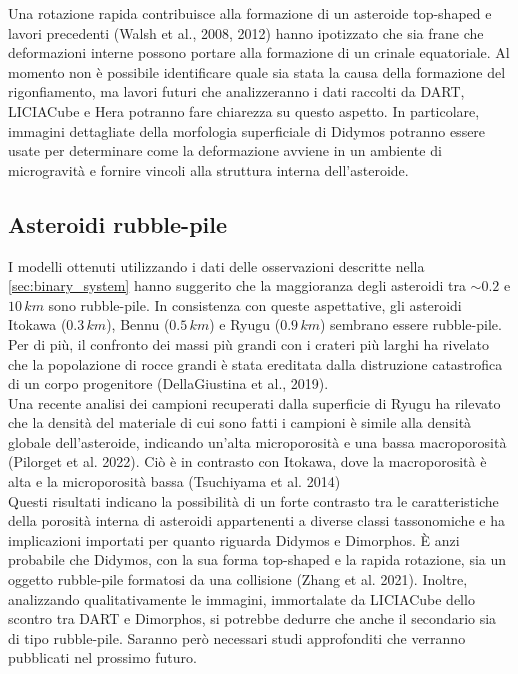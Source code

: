 \documentclass[a4paper,11pt,openright]{book}
\begin{document}
Una rotazione rapida contribuisce alla formazione di un asteroide top-shaped e lavori precedenti (Walsh et al., 2008, 2012) hanno ipotizzato che sia frane che deformazioni interne possono portare alla formazione di un crinale equatoriale. Al momento non è possibile identificare quale sia stata la causa della formazione del rigonfiamento, ma lavori futuri che analizzeranno i dati raccolti da DART, LICIACube e Hera potranno fare chiarezza su questo aspetto. In particolare, immagini dettagliate della morfologia superficiale di Didymos potranno essere usate per determinare come la deformazione avviene in un ambiente di microgravità e fornire vincoli alla struttura interna dell'asteroide.

\subsection{Asteroidi rubble-pile}
I modelli ottenuti utilizzando i dati delle osservazioni descritte nella \cref{sec:binary_system} hanno suggerito che la maggioranza degli asteroidi tra $\sim 0.2$ e $10\,km$ sono rubble-pile. In consistenza con queste aspettative, gli asteroidi Itokawa ($0.3\,km$), Bennu ($0.5\,km$) e Ryugu ($0.9\,km$) sembrano essere rubble-pile. Per di più, il confronto dei massi più grandi con i crateri più larghi ha rivelato che la popolazione di rocce grandi è stata ereditata dalla distruzione catastrofica di un corpo progenitore (DellaGiustina et al., 2019).\\
Una recente analisi dei campioni recuperati dalla superficie di Ryugu ha rilevato che la densità del materiale di cui sono fatti i campioni è simile alla densità globale dell'asteroide, indicando un'alta microporosità e una bassa macroporosità (Pilorget et al. 2022). Ciò è in contrasto con Itokawa, dove la macroporosità è alta e la microporosità bassa (Tsuchiyama et al. 2014)\\
Questi risultati indicano la possibilità di un forte contrasto tra le caratteristiche della porosità interna di asteroidi appartenenti a diverse classi tassonomiche e ha implicazioni importati per quanto riguarda Didymos e Dimorphos. È anzi probabile che Didymos, con la sua forma top-shaped e la rapida rotazione, sia un oggetto rubble-pile formatosi da una collisione (Zhang et al. 2021). Inoltre, analizzando qualitativamente le immagini, immortalate da LICIACube dello scontro tra DART e Dimorphos, si potrebbe dedurre che anche il secondario sia di tipo rubble-pile. Saranno però necessari studi approfonditi che verranno pubblicati nel prossimo futuro.
\end{document}
